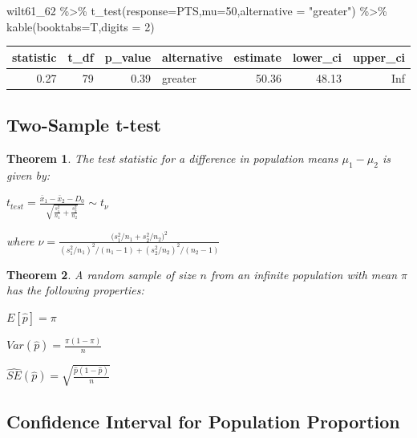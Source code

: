 \documentclass[
  11pt,
]{book}
\newenvironment{Shaded}{\begin{snugshade}}{\end{snugshade}}
\newcommand{\AttributeTok}[1]{\textcolor[rgb]{0.77,0.63,0.00}{#1}}
\newcommand{\DecValTok}[1]{\textcolor[rgb]{0.00,0.00,0.81}{#1}}
\newcommand{\FunctionTok}[1]{\textcolor[rgb]{0.00,0.00,0.00}{#1}}
\newcommand{\NormalTok}[1]{#1}
\newcommand{\SpecialCharTok}[1]{\textcolor[rgb]{0.00,0.00,0.00}{#1}}
\newcommand{\StringTok}[1]{\textcolor[rgb]{0.31,0.60,0.02}{#1}}
\newtheorem{theorem}{Theorem}[chapter]
\theoremstyle{definition}
\theoremstyle{definition}
\theoremstyle{definition}
\theoremstyle{definition}
\theoremstyle{remark}
\begin{document}
\bigskip

\begin{Shaded}
\begin{Highlighting}[]
\NormalTok{wilt61\_62 }\SpecialCharTok{\%\textgreater{}\%} \FunctionTok{t\_test}\NormalTok{(}\AttributeTok{response=}\NormalTok{PTS,}\AttributeTok{mu=}\DecValTok{50}\NormalTok{,}\AttributeTok{alternative =} \StringTok{"greater"}\NormalTok{) }\SpecialCharTok{\%\textgreater{}\%} 
  \FunctionTok{kable}\NormalTok{(}\AttributeTok{booktabs=}\NormalTok{T,}\AttributeTok{digits =} \DecValTok{2}\NormalTok{)}
\end{Highlighting}
\end{Shaded}

\begin{tabular}{rrrlrrr}
\toprule
statistic & t\_df & p\_value & alternative & estimate & lower\_ci & upper\_ci\\
\midrule
0.27 & 79 & 0.39 & greater & 50.36 & 48.13 & Inf\\
\bottomrule
\end{tabular}

\newpage

\hypertarget{two-sample-t-test}{%
\subsection{Two-Sample t-test}\label{two-sample-t-test}}

\begin{theorem}
The test statistic for a difference in population means \(\mu_1 - \mu_2\) is given by:

\(t_{test} = \frac{\bar{x}_1 -\bar{x}_2 - D_0}{\sqrt{\frac{s_1^2}{n_1}+\frac{s_2^2}{n_2}}} \sim t_{\nu}\)

where \(\nu = \frac{\big(s_1^2/n_1 + s_2^2/n_2\big)^2}{(s_1^2/n_1)^2/(n_1-1) + (s_2^2/n_2)^2/(n_2-1)}\)
\end{theorem}

\newpage

\begin{theorem}
A random sample of size \(n\) from an infinite population with mean \(\pi\) has the following properties:

\(E[\hat{p}] = \pi\)

\(Var(\hat{p}) = \frac{\pi(1-\pi)}{n}\)

\(\hat{SE}(\hat{p}) = \sqrt{\frac{\hat{p}(1-\hat{p})}{n}}\)
\end{theorem}

\hypertarget{confidence-interval-for-population-proportion}{%
\subsection{Confidence Interval for Population Proportion}\label{confidence-interval-for-population-proportion}}
\end{document}
